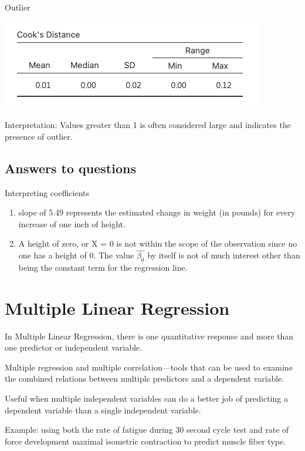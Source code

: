\documentclass[
]{article}
\providecommand{\tightlist}{%
  \setlength{\itemsep}{0pt}\setlength{\parskip}{0pt}}
\begin{document}
Outlier

\includegraphics{images/paste-42FF4628.png}

Interpretation: Values greater than 1 is often considered large and indicates the presence of outlier.

\hypertarget{answers-to-questions}{%
\subsection{Answers to questions}\label{answers-to-questions}}

Interpreting coefficients

\begin{enumerate}
\def\labelenumi{\arabic{enumi}.}
\tightlist
\item
  slope of 5.49 represents the estimated change in weight (in pounds) for every increase of one inch of height.\\
\item
  A height of zero, or X = 0 is not within the scope of the observation since no one has a height of 0. The value \(\hat{\beta_0}\) by itself is not of much interest other than being the constant term for the regression line.
\end{enumerate}

\hypertarget{multiple-linear-regression}{%
\section{Multiple Linear Regression}\label{multiple-linear-regression}}

In Multiple Linear Regression, there is one quantitative response and more than one predictor or independent variable.

Multiple regression and multiple correlation---tools that can be used to examine the combined relations between multiple predictors and a dependent variable.

Useful when multiple independent variables can do a better job of predicting a dependent variable than a single independent variable.

Example: using both the rate of fatigue during 30 second cycle test and rate of force development maximal isometric contraction to predict muscle fiber type.
\end{document}
